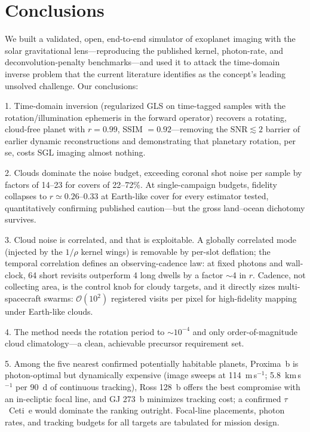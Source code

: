 ﻿\documentclass[twocolumn,10pt]{article}
\begin{document}
\section{Conclusions}
\label{sec:conclusions}

We built a validated, open, end-to-end simulator of exoplanet imaging
with the solar gravitational lens---reproducing the published kernel,
photon-rate, and deconvolution-penalty benchmarks---and used it to
attack the time-domain inverse problem that the current literature
identifies as the concept's leading unsolved challenge. Our conclusions:

1. Time-domain inversion (regularized GLS on time-tagged samples with
the rotation/illumination ephemeris in the forward operator) recovers a
rotating, cloud-free planet with $r=0.99$, SSIM $=0.92$---removing the
$\mathrm{SNR}\lesssim2$ barrier of earlier dynamic reconstructions and
demonstrating that planetary rotation, per se, costs SGL imaging almost
nothing.

2. Clouds dominate the noise budget, exceeding coronal shot noise
per sample by factors of 14--23 for covers of 22--72\%. At
single-campaign budgets, fidelity collapses to $r\simeq0.26$--0.33 at
Earth-like cover for every estimator tested, quantitatively confirming
published caution---but the gross land--ocean dichotomy survives.

3. Cloud noise is correlated, and that is exploitable. A globally
correlated mode (injected by the $1/\rho$ kernel wings) is removable by
per-slot deflation; the temporal correlation defines an
observing-cadence law: at fixed photons and wall-clock, 64 short
revisits outperform 4 long dwells by a factor $\sim$4 in $r$. Cadence,
not collecting area, is the control knob for cloudy targets, and it
directly sizes multi-spacecraft swarms: $\mathcal{O}(10^2)$ registered
visits per pixel for high-fidelity mapping under Earth-like clouds.

4. The method needs the rotation period to $\sim10^{-4}$ and only
order-of-magnitude cloud climatology---a clean, achievable precursor
requirement set.

5. Among the five nearest confirmed potentially habitable planets,
Proxima~b is photon-optimal but dynamically expensive
(image sweeps at 114~m\,s$^{-1}$; 5.8~km\,s$^{-1}$ per 90~d of
continuous tracking), Ross 128~b offers the best compromise with an
in-ecliptic focal line, and GJ 273~b minimizes tracking cost; a
confirmed $\tau$~Ceti~e would dominate the ranking outright. Focal-line
placements, photon rates, and tracking budgets for all targets are
tabulated for mission design.
\end{document}
